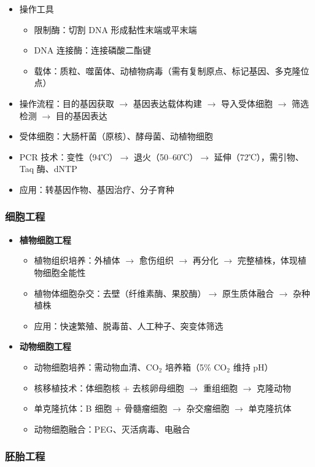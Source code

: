 \begin{itemize}
  \item 操作工具
  \begin{itemize}
    \item 限制酶：切割 DNA 形成黏性末端或平末端
    \item DNA 连接酶：连接磷酸二酯键
    \item 载体：质粒、噬菌体、动植物病毒（需有复制原点、标记基因、多克隆位点）
  \end{itemize}
  \item 操作流程：目的基因获取 $\to$ 基因表达载体构建 $\to$ 导入受体细胞 $\to$ 筛选检测 $\to$ 目的基因表达
  \item 受体细胞：大肠杆菌（原核）、酵母菌、动植物细胞
  \item PCR 技术：变性（94℃）$\to$ 退火（50--60℃）$\to$ 延伸（72℃），需引物、Taq 酶、dNTP
  \item 应用：转基因作物、基因治疗、分子育种
\end{itemize}

\subsubsection{细胞工程}

\begin{itemize}
  \item \textbf{植物细胞工程}
  \begin{itemize}
    \item 植物组织培养：外植体 $\to$ 愈伤组织 $\to$ 再分化 $\to$ 完整植株，体现植物细胞全能性
    \item 植物体细胞杂交：去壁（纤维素酶、果胶酶）$\to$ 原生质体融合 $\to$ 杂种植株
    \item 应用：快速繁殖、脱毒苗、人工种子、突变体筛选
  \end{itemize}
  \item \textbf{动物细胞工程}
  \begin{itemize}
    \item 动物细胞培养：需动物血清、CO$_2$ 培养箱（5\% CO$_2$ 维持 pH）
    \item 核移植技术：体细胞核 + 去核卵母细胞 $\to$ 重组细胞 $\to$ 克隆动物
    \item 单克隆抗体：B 细胞 + 骨髓瘤细胞 $\to$ 杂交瘤细胞 $\to$ 单克隆抗体
    \item 动物细胞融合：PEG、灭活病毒、电融合
  \end{itemize}
\end{itemize}

\subsubsection{胚胎工程}

